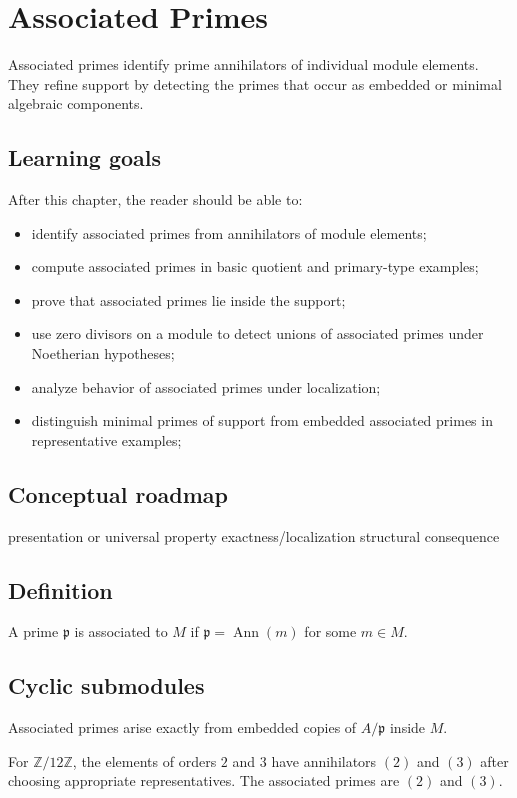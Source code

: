 \chapter{Associated Primes}
\label{ch:v17}

Associated primes identify prime annihilators of individual module elements. They refine support by detecting the primes that occur as embedded or minimal algebraic components.

\section*{Learning goals}
After this chapter, the reader should be able to:
\begin{itemize}
\item identify associated primes from annihilators of module elements;
\item compute associated primes in basic quotient and primary-type examples;
\item prove that associated primes lie inside the support;
\item use zero divisors on a module to detect unions of associated primes under Noetherian hypotheses;
\item analyze behavior of associated primes under localization;
\item distinguish minimal primes of support from embedded associated primes in representative examples;
\end{itemize}
\section*{Conceptual roadmap}
\volroadmap
  {presentation or universal property}
  {exactness/localization}
  {structural consequence}

\section{Definition}
A prime $\mathfrak p$ is associated to $M$ if $\mathfrak p=\operatorname{Ann}(m)$ for some $m\in M$.

\section{Cyclic submodules}
Associated primes arise exactly from embedded copies of $A/\mathfrak p$ inside $M$.

\begin{example}\label{ex:v17-expand-01}
For $\mathbb Z/12\mathbb Z$, the elements of orders $2$ and $3$ have annihilators $(2)$ and $(3)$ after choosing appropriate representatives. The associated primes are $(2)$ and $(3)$.
\end{example}
